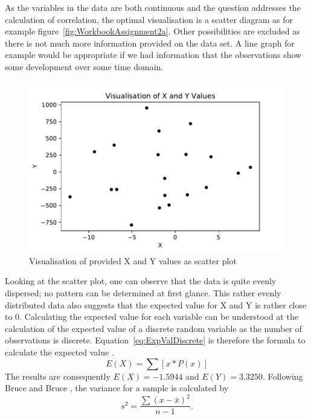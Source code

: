 As the variables in the data are both continuous and the question addresses the calculation of correlation, the optimal visualisation is a scatter diagram as for example figure~\eqref{fig:WorkbookAssignment2a}. Other possibilities are excluded as there is not much more information provided on the data set. A line graph for example would be appropriate if we had information that the observations show some development over some time domain. 
\begin{figure}[h]
\centering
\includegraphics[width=16cm]{pics/WorkbookAssignment2a.pdf}
\caption{Visualisation of provided X and Y values as scatter plot}
\label{fig:WorkbookAssignment2a}
\end{figure}
\FloatBarrier
Looking at the scatter plot, one can observe that the data is quite evenly dispersed; no pattern can be determined at first glance. This rather evenly distributed data also suggests that the expected value for X and Y is rather close to 0. Calculating the expected value for each variable can be understood at the calculation of the expected value of a discrete random variable as the number of observations is discrete. Equation~\eqref{eq:ExpValDiscrete} is therefore the formula to calculate the expected value \cite{mathcenter}. 
\begin{equation}  
E(X) = \sum \left[x * P(x)\right]
\label{eq:ExpValDiscrete}
\end{equation}
The results are consequently $E(X) = -1.5944$ and $E(Y) = 3.3250$.
Following Bruce and Bruce \cite{bruce2017practical}, the variance for a sample is calculated by 
\begin{equation}  
s^2 = \frac{\sum{(x-\bar{x})^2}}{n-1}.
\label{eq:ExpValDiscrete}
\end{equation}
